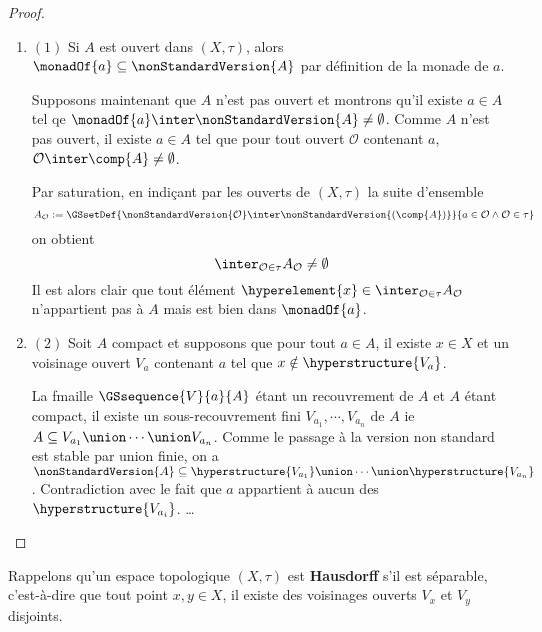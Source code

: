 \ifdefined\outputproof
\begin{proof}
	\begin{enumerate}
		\item $(1)$ Si $A$ est ouvert dans $(X, \tau)$, alors $\monadOf{a}
			\subseteq \nonStandardVersion{A}$ par définition de la monade de $a$.

			Supposons maintenant que $A$ n'est pas ouvert et montrons qu'il
			existe $a \in A$ tel qe $\monadOf{a} \inter \nonStandardVersion{A} \neq
			\emptyset$. Comme $A$ n'est pas ouvert, il existe $a \in A$ tel que
			pour tout ouvert $\mathcal{O}$ contenant $a$, $\mathcal{O} \inter
			\comp{A} \neq \emptyset$.

			Par saturation, en indiçant par les ouverts de $(X, \tau)$ la suite
			d'ensemble
			\begin{equation}
				A_{\mathcal{O}} := \GSsetDef{\nonStandardVersion{\mathcal{O}} \inter
				\nonStandardVersion{(\comp{A})}}{a \in \mathcal{O} \wedge
				\mathcal{O} \in \tau}
			\end{equation}
			on obtient
			\begin{equation}
				\inter_{\mathcal{O} \in \tau} A_{\mathcal{O}} \neq \emptyset
			\end{equation}
			Il est alors clair que tout élément $\hyperelement{x} \in
			\inter_{\mathcal{O} \in \tau} A_{\mathcal{O}}$ n'appartient pas à
			$A$ mais est bien dans $\monadOf{a}$.

		\item $(2)$ Soit $A$ compact et supposons que pour tout $a \in A$, il
			existe $x \in X$ et un voisinage ouvert $V_{a}$ contenant $a$ tel
			que $x \notin \hyperstructure{V_{a}}$.

			La fmaille $\GSsequence{V}{a}{A}$ étant un recouvrement de $A$ et
			$A$ étant compact, il existe un sous-recouvrement fini $V_{a_{1}},
			\cdots, V_{a_{n}}$ de $A$ ie $A \subseteq V_{a_{1}} \union \cdots
			\union V_{a_{n}}$. Comme le passage à la version non standard est
			stable par union finie, on a $\nonStandardVersion{A} \subseteq
			\hyperstructure{V_{a_{1}}} \union \cdots \union
			\hyperstructure{V_{a_{n}}}$. Contradiction avec le fait que $a$
			appartient à aucun des $\hyperstructure{V_{a_{i}}}$.
			\ldots
	\end{enumerate}
\end{proof}
\fi

Rappelons qu'un espace topologique $(X, \tau)$ est \textbf{Hausdorff} s'il est
séparable, c'est-à-dire que tout point $x, y \in X$, il existe des voisinages
ouverts $V_{x}$ et $V_{y}$ disjoints.

